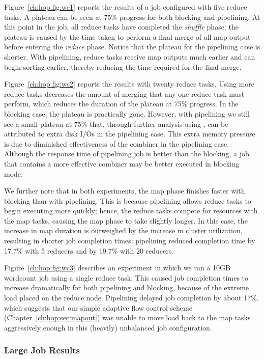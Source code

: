 Figure~\ref{ch:hop:fig:wc1} reports the results of a job configured with five
reduce tasks.  A plateau can be seen at 75\% progress for both blocking and
pipelining.  At this point in the job, all reduce tasks have completed the {\em
shuffle} phase; the plateau is caused by the time taken to perform a final
merge of all map output before entering the {\em reduce} phase.  Notice that
the plateau for the pipelining case is shorter.  With pipelining, reduce tasks
receive map outputs much earlier and can begin sorting earlier, thereby
reducing the time required for the final merge.

Figure~\ref{ch:hop:fig:wc2} reports the results with twenty reduce tasks.
Using more reduce tasks decreases the amount of merging that any one reduce
task must perform, which reduces the duration of the plateau at 75\% progress.
In the blocking case, the plateau is practically gone.  However, with
pipelining we still see a small plateau at 75\% that, through further analysis
using , can be attributed to extra disk I/Os in the pipelining case.
This extra memory pressure is due to diminished effectiveness of the combiner
in the pipelining case.  Although the response time of pipelining job is better
than the blocking, a job that contains a more effective combiner may be better
executed in blocking mode.

We further note that in both experiments, the map phase finishes faster with
blocking than with pipelining.  This is because pipelining allows reduce tasks
to begin executing more quickly; hence, the reduce tasks compete for resources
with the map tasks, causing the map phase to take slightly longer.  In this
case, the increase in map duration is outweighed by the increase in cluster
utilization, resulting in shorter job completion times: pipelining reduced
completion time by 17.7\% with 5 reducers and by 19.7\% with 20 reducers.

Figure~\ref{ch:hop:fig:wc3} describes an experiment in which we ran a 10GB
wordcount job using a single reduce task.  This caused job completion times to
increase dramatically for both pipelining and blocking, because of the extreme
load placed on the reduce node.  Pipelining delayed job completion by about
17\%, which suggests that our simple adaptive flow control scheme
(Chapter~\ref{ch:hop:sec:mapout}) was unable to move load back to the map tasks
aggressively enough in this (heavily) unbalanced job configuration.

\subsubsection{Large Job Results}

